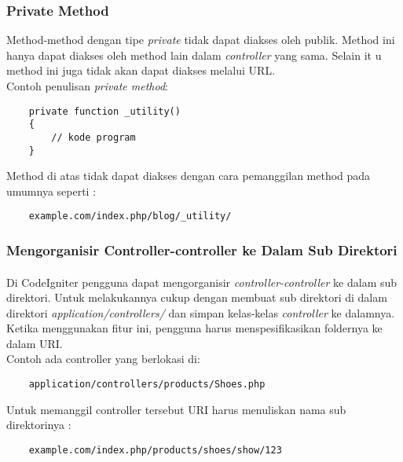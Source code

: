 	\subsubsection{Private Method}
	Method-method dengan tipe \textit{private} tidak dapat diakses oleh publik. Method ini hanya dapat diakses oleh method lain dalam \textit{controller} yang sama. Selain it           u method ini juga tidak akan dapat diakses melalui URL.\cite{CodeIgniter:17}\\
Contoh penulisan \textit{private method}:
\begin{lstlisting}
	private function _utility()
	{
        // kode program
	}
\end{lstlisting}
Method di atas tidak dapat diakses dengan cara pemanggilan method pada umumnya seperti :
\begin{lstlisting}
	example.com/index.php/blog/_utility/
\end{lstlisting}

	\subsubsection{Mengorganisir Controller-controller ke Dalam Sub Direktori}
\paragraph{} Di CodeIgniter pengguna dapat mengorganisir \textit{controller-controller} ke dalam sub direktori. Untuk melakukannya cukup dengan membuat sub direktori di dalam direktori \textit{application/controllers/} dan simpan kelas-kelas \textit{controller} ke dalamnya. Ketika menggunakan fitur ini, pengguna harus menspesifikasikan foldernya ke dalam URI.\cite{CodeIgniter:17} \\
Contoh ada controller yang berlokasi di:
\begin{lstlisting}
	application/controllers/products/Shoes.php
 \end{lstlisting}
Untuk memanggil controller tersebut URI harus menuliskan nama sub direktorinya :
\begin{lstlisting}
	example.com/index.php/products/shoes/show/123
\end{lstlisting}

